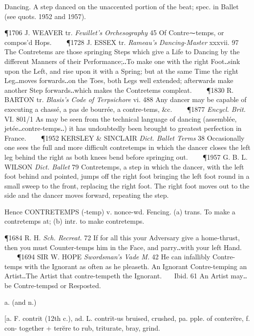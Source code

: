 \begin{description}[wide, labelwidth=!, labelindent=0pt]
\begin{myenumerate}
 Dancing. A step danced on the unaccented portion of the beat; spec. in Ballet (see quots. 1952 and 1957). 

\P 1706 J. WEAVER tr. \textit{Feuillet's Orchesography} 45 Of Contre⁓temps, or compos'd Hops.    
\P 1728 J. ESSEX tr. \textit{Rameau's Dancing-Master} xxxvii. 97 The Contretems are those springing Steps which give a Life to Dancing by the different Manners of their Performance;‥To make one with the right Foot‥sink upon the Left, and rise upon it with a Spring; but at the same Time the right Leg‥moves forwards‥on the Toes, both Legs well extended; afterwards make another Step forwards‥which makes the Contretems compleat.    
\P 1830 R. BARTON tr. \textit{Blasis's Code of Terpsichore} vi. 488 Any dancer may be capable of executing a chassé, a pas de bourrée, a contre-tems, \&c.    
\P 1877  \textit{Encycl. Brit.} VI. 801/1 As may be seen from the technical language of dancing (assemblée, jetée‥contre-temps‥) it has undoubtedly been brought to greatest perfection in France.    
\P 1952 KERSLEY \& SINCLAIR  \textit{Dict. Ballet Terms} 38 Occasionally one sees the full and more difficult contretemps in which the dancer closes the left leg behind the right as both knees bend before springing out.    
\P 1957 G. B. L.  WILSON \textit{Dict. Ballet} 79 Contretemps, a step in which the dancer, with the left foot behind and pointed, jumps off the right foot bringing the left foot round in a small sweep to the front, replacing the right foot. The right foot moves out to the side and the dancer moves forward, repeating the step.

\noindent
Hence CONTRETEMPS (-temp) v. nonce-wd. Fencing. (a) trans. To make a contretemps at; (b) intr. to make contretemps.

\P 1684 R. H. \textit{Sch.  Recreat.} 72 If for all this your Adversary give a home-thrust, then you must Counter-temps him in the Face, and parry‥with your left Hand.    
\P 1694 SIR W. HOPE  \textit{Swordsman's Vade M.} 42 He can infallibly Contre-temps with the Ignorant as often as he pleaseth. An Ignorant Contre-temping an Artist‥The Artist that contre-tempeth the Ignorant.    Ibid. 61 An Artist may‥be Contre-tempsd or Resposted.
\end{myenumerate}


 a. (and n.)

\noindent {}

\noindent [a. F. contrit (12th c.), ad. L. contrīt-us bruised, crushed, pa. pple. of conterĕre, f. con- together + terĕre to rub, triturate, bray, grind.


\end{description}
